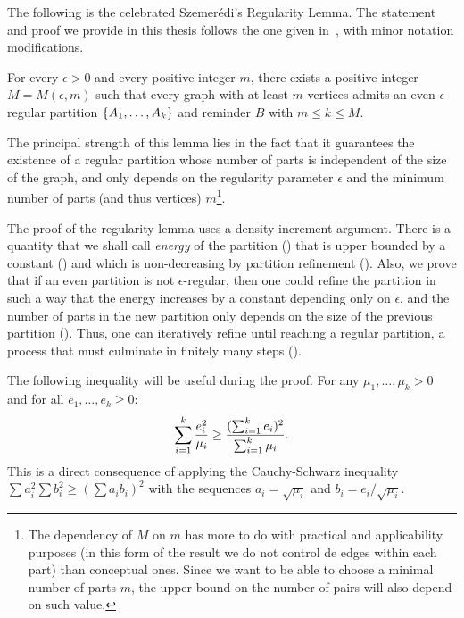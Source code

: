         The following is the celebrated Szemerédi's Regularity Lemma.
        The statement and proof we provide in this thesis follows the one given in~\cite{extremal_graph_theory},
        with minor notation modifications.

        \begin{theorem} \label{thm:szemeredi_regularity_lemma}
            For every $\epsilon > 0$ and every positive integer $m$, there exists a positive integer $M = M(\epsilon, m)$
            such that every graph with at least $m$ vertices admits an even $\epsilon$-regular partition
            $\{ A_1, \ldots, A_k \}$ and reminder $B$ with $m \leq k \leq M$.
        \end{theorem}

        The principal strength of this lemma lies in the fact that it guarantees the existence of a regular partition
        whose number of parts is independent of the size of the graph, and only depends on the regularity parameter
        $\epsilon$ and the minimum number of parts (and thus vertices) $m$\footnote{
            The dependency of $M$ on $m$ has more to do with practical and applicability purposes (in this form of the
            result we do not control de edges within each part) than conceptual ones.
            Since we want to be able to choose a minimal number of parts $m$, the upper bound on the number of pairs will
            also depend on such value.}.

        The proof of the regularity lemma uses a density-increment argument.
        There is a quantity that we shall call \emph{energy} of the partition () that is upper bounded by
        a constant () and which is non-decreasing by partition refinement
        ().
        Also, we prove that if an even partition is not $\epsilon$-regular, then one could refine the partition in
        such a way that the energy increases by a constant depending only on $\epsilon$, and the number of parts in the
        new partition only depends on the size of the previous partition
        ().
        Thus, one can iteratively refine until reaching a regular partition, a process that must culminate in finitely
        many steps ().

        The following inequality will be useful during the proof.
        For any $\mu_1, \dots, \mu_k > 0$ and for all $e_1, \dots, e_k \geq 0$:
        \begin{equation} \label{eq:cauchy_schwarz_inequality_plus}
            \sum_{i=1}^k \frac{e_i^2}{\mu_i}
                \geq \frac{( \sum_{i=1}^k e_i )^2}{\sum_{i=1}^k \mu_i}.
        \end{equation}
        This is a direct consequence of applying the Cauchy-Schwarz inequality $\sum a_i^2 \sum b_i^2 \geq (\sum a_i b_i)^2$
        with the sequences $a_i = \sqrt{\mu_i}$ and $b_i = e_i / \sqrt{\mu_i}$.

